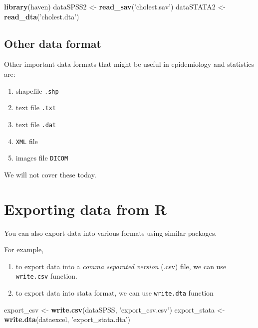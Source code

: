 \documentclass[]{book}
\newenvironment{Shaded}{\begin{snugshade}}{\end{snugshade}}
\newcommand{\KeywordTok}[1]{\textcolor[rgb]{0.13,0.29,0.53}{\textbf{#1}}}
\newcommand{\StringTok}[1]{\textcolor[rgb]{0.31,0.60,0.02}{#1}}
\newcommand{\NormalTok}[1]{#1}
\providecommand{\tightlist}{%
  \setlength{\itemsep}{0pt}\setlength{\parskip}{0pt}}
\theoremstyle{definition}
\theoremstyle{definition}
\theoremstyle{remark}
\begin{document}
\begin{Shaded}
\begin{Highlighting}[]
\KeywordTok{library}\NormalTok{(haven)}
\NormalTok{dataSPSS2 <-}\StringTok{ }\KeywordTok{read_sav}\NormalTok{(}\StringTok{'cholest.sav'}\NormalTok{)}
\NormalTok{dataSTATA2 <-}\StringTok{ }\KeywordTok{read_dta}\NormalTok{(}\StringTok{'cholest.dta'}\NormalTok{)}
\end{Highlighting}
\end{Shaded}

\subsection{Other data format}\label{other-data-format}

Other important data formats that might be useful in epidemiology and
statistics are:

\begin{enumerate}
\def\labelenumi{\arabic{enumi}.}
\tightlist
\item
  shapefile \texttt{.shp}
\item
  text file \texttt{.txt}
\item
  text file \texttt{.dat}
\item
  \texttt{XML} file
\item
  images file \texttt{DICOM}
\end{enumerate}

We will not cover these today.

\section{Exporting data from R}\label{exporting-data-from-r}

You can also export data into various formats using similar packages.

For example,

\begin{enumerate}
\def\labelenumi{\arabic{enumi}.}
\tightlist
\item
  to export data into a \emph{comma separated version} (.csv) file, we
  can use \texttt{write.csv} function.
\item
  to export data into stata format, we can use \texttt{write.dta}
  function
\end{enumerate}

\begin{Shaded}
\begin{Highlighting}[]
\NormalTok{export_csv <-}\StringTok{ }\KeywordTok{write.csv}\NormalTok{(dataSPSS, }\StringTok{'export_csv.csv'}\NormalTok{)}
\NormalTok{export_stata <-}\StringTok{ }\KeywordTok{write.dta}\NormalTok{(dataexcel, }\StringTok{'export_stata.dta'}\NormalTok{) }
\end{Highlighting}
\end{Shaded}
\end{document}

